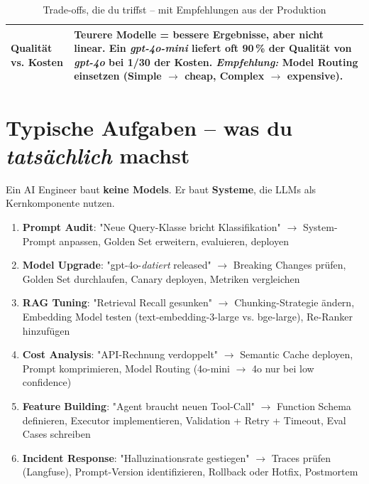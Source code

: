 \begin{table}[H]
\begin{tabularx}{\linewidth}{>{\raggedright\arraybackslash}p{4cm} X}
\textbf{Qualität vs. Kosten} & 
Teurere Modelle = bessere Ergebnisse, aber nicht linear. \newline
Ein \textit{gpt-4o-mini} liefert oft 90\,\% der Qualität von \textit{gpt-4o} bei 1/30 der Kosten. \newline
\textit{Empfehlung:} Model Routing einsetzen (Simple $\to$ cheap, Complex $\to$ expensive). \\

\bottomrule
\end{tabularx}
\caption{Trade-offs, die du triffst -- mit Empfehlungen aus der Produktion}
\label{tab:role_tradeoffs}
\end{table}


\section{Typische Aufgaben -- was du \textit{tatsächlich} machst}

Ein AI Engineer baut \textbf{keine Models}. Er baut \textbf{Systeme}, die LLMs als Kernkomponente nutzen.

\begin{enumerate}[leftmargin=*]
    \item \textbf{Prompt Audit}: "Neue Query-Klasse bricht Klassifikation" $\to$ System-Prompt anpassen, Golden Set erweitern, evaluieren, deployen
    \item \textbf{Model Upgrade}: "gpt-4o-\textit{datiert} released" $\to$ Breaking Changes prüfen, Golden Set durchlaufen, Canary deployen, Metriken vergleichen
    \item \textbf{RAG Tuning}: "Retrieval Recall gesunken" $\to$ Chunking-Strategie ändern, Embedding Model testen (text-embedding-3-large vs. bge-large), Re-Ranker hinzufügen
    \item \textbf{Cost Analysis}: "API-Rechnung verdoppelt" $\to$ Semantic Cache deployen, Prompt komprimieren, Model Routing (4o-mini $\to$ 4o nur bei low confidence)
    \item \textbf{Feature Building}: "Agent braucht neuen Tool-Call" $\to$ Function Schema definieren, Executor implementieren, Validation + Retry + Timeout, Eval Cases schreiben
    \item \textbf{Incident Response}: "Halluzinationsrate gestiegen" $\to$ Traces prüfen (Langfuse), Prompt-Version identifizieren, Rollback oder Hotfix, Postmortem
\end{enumerate}




